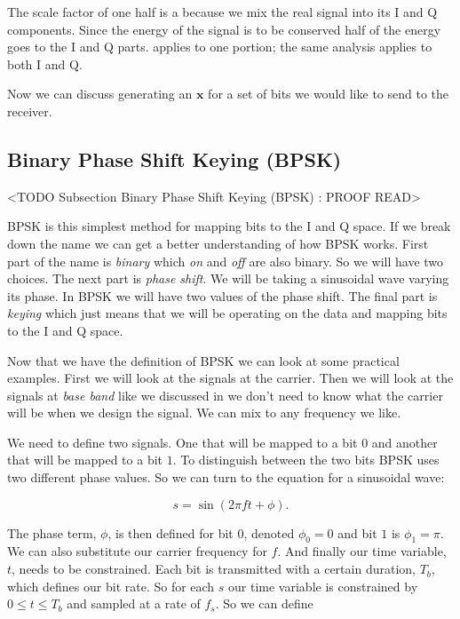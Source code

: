 The scale factor of one half is a because we mix the real signal into its \ac{I} and \ac{Q} components. Since the energy of the signal is to be conserved half of the energy goes to the \ac{I} and \ac{Q} parts.  applies to one portion; the same analysis applies to both \ac{I} and \ac{Q}.

Now we can discuss generating an $\mathbf{x}$ for a set of bits we would like to send to the receiver. 
	
\subsection{Binary Phase Shift Keying (BPSK)}
	<TODO Subsection Binary Phase Shift Keying (BPSK) : PROOF READ>

\ac{BPSK} is this simplest method for mapping bits to the \ac{I} and \ac{Q} space. If we break down the name we can get a better understanding of how \ac{BPSK} works. First part of the name is \emph{binary} which \emph{on} and \emph{off} are also binary. So we will have two choices. The next part is \emph{phase shift}. We will be taking a sinusoidal wave varying its phase. In \ac{BPSK} we will have two values of the phase shift. The final part is \emph{keying} which just means that we will be operating on the data and mapping bits to the \ac{I} and \ac{Q} space.

Now that we have the definition of \ac{BPSK} we can look at some practical examples. First we will look at the signals at the carrier. Then we will look at the signals at \emph{base band} like we discussed in  we don't need to know what the carrier will be when we design the signal. We can mix to any frequency we like.

We need to define two signals. One that will be mapped to a bit $0$ and another that will be mapped to a bit $1$. To distinguish between the two bits \ac{BPSK} uses two different phase values. So we can turn to the equation for a sinusoidal wave:

\begin{equation}
s = \sin\left(2\pi ft + \phi\right).
\end{equation}

The phase term, $\phi$, is then defined for bit $0$, denoted $\phi_0=0$ and bit $1$ is $\phi_1=\pi$. We can also substitute our carrier frequency for $f$. And finally our time variable, $t$, needs to be constrained. Each bit is transmitted with a certain duration, $T_b$, which defines our bit rate. So for each $s$ our time variable is constrained by $0 \leq t \leq T_b$ and sampled at a rate of $f_s$. So we can define

